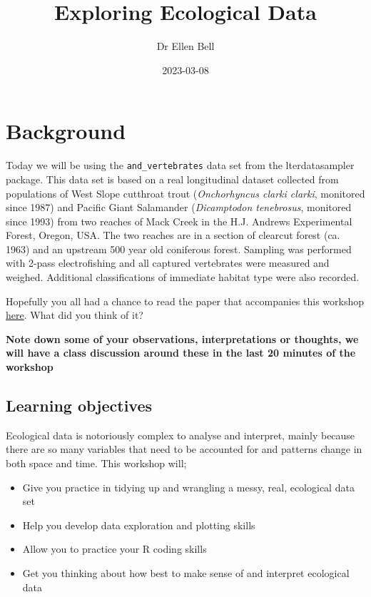 \documentclass[
]{book}
\title{Exploring Ecological Data}
\author{Dr Ellen Bell}
\date{2023-03-08}
\providecommand{\tightlist}{%
  \setlength{\itemsep}{0pt}\setlength{\parskip}{0pt}}
\begin{document}
\maketitle

{
\setcounter{tocdepth}{1}
\tableofcontents
}
\hypertarget{background}{%
\chapter{Background}\label{background}}

Today we will be using the \texttt{and\_vertebrates} data set from the lterdatasampler package. This data set is based on a real longitudinal dataset collected from populations of West Slope cutthroat trout (\emph{Onchorhyncus clarki clarki}, monitored since 1987) and Pacific Giant Salamander (\emph{Dicamptodon tenebrosus}, monitored since 1993) from two reaches of Mack Creek in the H.J. Andrews Experimental Forest, Oregon, USA. The two reaches are in a section of clearcut forest (ca. 1963) and an upstream 500 year old coniferous forest. Sampling was performed with 2-pass electrofishing and all captured vertebrates were measured and weighed. Additional classifications of immediate habitat type were also recorded.

Hopefully you all had a chance to read the paper that accompanies this workshop \href{https://esajournals.onlinelibrary.wiley.com/doi/full/10.1002/ecs2.1845}{here}. What did you think of it?

\textbf{Note down some of your observations, interpretations or thoughts, we will have a class discussion around these in the last 20 minutes of the workshop}

\hypertarget{learning-objectives}{%
\section{Learning objectives}\label{learning-objectives}}

Ecological data is notoriously complex to analyse and interpret, mainly because there are so many variables that need to be accounted for and patterns change in both space and time. This workshop will;

\begin{itemize}
\tightlist
\item
  Give you practice in tidying up and wrangling a messy, real, ecological data set
\item
  Help you develop data exploration and plotting skills
\item
  Allow you to practice your R coding skills
\item
  Get you thinking about how best to make sense of and interpret ecological data
\end{itemize}
\end{document}
